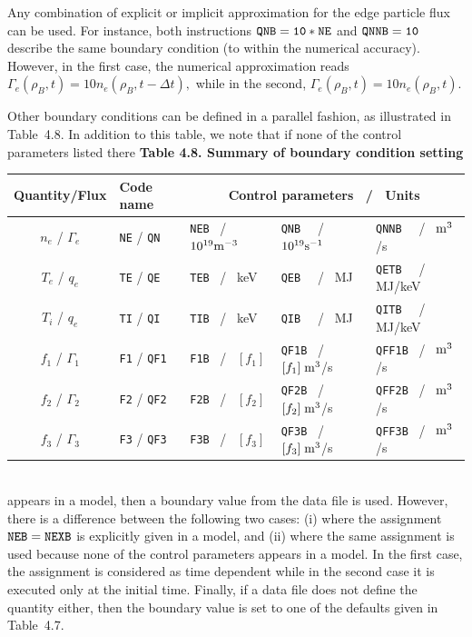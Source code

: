 Any combination of explicit or implicit approximation for the edge
particle flux can be used.
For instance, both instructions
${\tt QNB=10*NE}$ and ${\tt QNNB=10}$ describe
the same boundary condition (to within the numerical accuracy).
However, in the first case, the numerical approximation reads 
$\Gamma_e(\rho_B,t)=10n_e(\rho_B,t-\Delta t),$ while in the second,
$\Gamma_e(\rho_B,t)=10n_e(\rho_B,t).$ 

Other boundary conditions can be defined in a parallel fashion, as
illustrated in Table~4.8.
In addition to this table, we note that if none of the control parameters
listed there 
\linebreak\indent
{\bf Table 4.8. Summary of boundary condition setting}
\bigskip\\ \noindent
\begin{tabular}{| c | l | l | l | l |}\hline
Quantity/Flux & Code name  
	& \multicolumn{3}{c|}{Control parameters ~/~ Units}\\	\hline
$n_e$ / $\Gamma_e$
	&{\tt NE} / {\tt QN} 
		&{\tt NEB} ~/~ $10^{19}{\rm m}^{-3}$
			&{\tt QNB~} ~/~ $10^{19}{\rm s}^{-1}$
				&{\tt QNNB~} ~/~ ${\rm m}^3$/s	\\
$T_e$ / $q_e$	& {\tt TE} / {\tt QE}	
	&{\tt TEB} ~/~ keV & {\tt QEB~} ~/~ MJ	&{\tt QETB~} ~/~ MJ/keV\\
$T_i$ / $q_e$	& {\tt TI} / {\tt QI}
	&{\tt TIB} ~/~ keV & {\tt QIB~} ~/~ MJ	&{\tt QITB~} ~/~ MJ/keV\\
$f_1$ / $\Gamma_1$&{\tt F1} / {\tt QF1}	&{\tt F1B} ~/~ $[f_1]$
		 &{\tt QF1B} ~/~ $[f_1]\;{\rm m}^3$/s
			&{\tt QFF1B} ~/~ ${\rm m}^3$/s		\\
$f_2$ / $\Gamma_2$&{\tt F2} / {\tt QF2}	&{\tt F2B} ~/~ $[f_2]$
		 &{\tt QF2B} ~/~ $[f_2]\;{\rm m}^3$/s
			&{\tt QFF2B} ~/~ ${\rm m}^3$/s		\\
$f_3$ / $\Gamma_3$&{\tt F3} / {\tt QF3}	&{\tt F3B} ~/~ $[f_3]$
		 &{\tt QF3B} ~/~ $[f_3]\;{\rm m}^3$/s
			&{\tt QFF3B} ~/~ ${\rm m}^3$/s		\\
\hline
\end{tabular}
\\[2ex]
appears in a model, then a boundary value from the data file is used.
However, there is a difference between the following two cases: (i)
where the assignment ${\tt NEB=NEXB}$ is explicitly given in a model,
and (ii) where the same assignment is used because none of the control
parameters appears in a model. 
In the first case, the assignment is considered as time dependent while
in the second case it is executed only at the initial time.
Finally, if a data file does not define the quantity either, then the
boundary value is set to one of the defaults given in Table~4.7.

